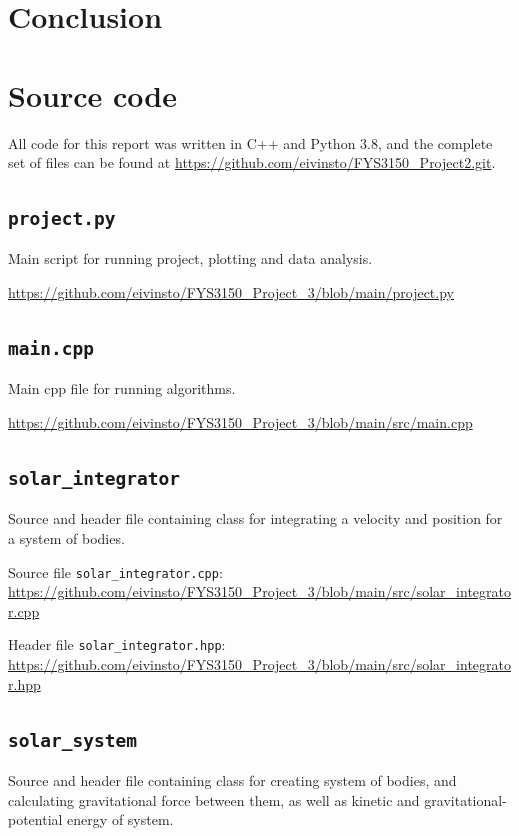 \documentclass[reprint,english,notitlepage]{revtex4-1}  %
\begin{document}
\section{Conclusion} \label{sec:VI}





\onecolumngrid
{}
\newpage
\twocolumngrid

\appendix
\section{Source code} \label{A}
All code for this report was written in C++ and Python 3.8, and the complete set of files can be found at
\url{https://github.com/eivinsto/FYS3150_Project2.git}.

\cprotect\subsection{\verb+project.py+} \label{A.1}
Main script for running project, plotting and data analysis.

\url{https://github.com/eivinsto/FYS3150_Project_3/blob/main/project.py}

\cprotect\subsection{\verb+main.cpp+} \label{A.2}
Main cpp file for running algorithms.

\url{https://github.com/eivinsto/FYS3150_Project_3/blob/main/src/main.cpp}

\cprotect\subsection{\verb+solar_integrator+} \label{A.3}
Source and header file containing class for integrating a velocity and position for a system of bodies.

Source file \verb+solar_integrator.cpp+:
\url{https://github.com/eivinsto/FYS3150_Project_3/blob/main/src/solar_integrator.cpp}

Header file \verb+solar_integrator.hpp+:
\url{https://github.com/eivinsto/FYS3150_Project_3/blob/main/src/solar_integrator.hpp}

\cprotect\subsection{\verb+solar_system+} \label{A.4}
Source and header file containing class for creating system of bodies, and calculating gravitational force between them, as well as kinetic and gravitational-potential energy of system.
\end{document}
